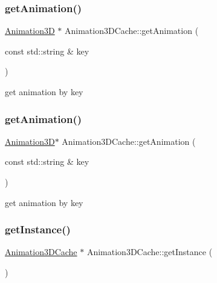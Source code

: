 \subsubsection{\texorpdfstring{get\+Animation()}{getAnimation()}\hspace{0.1cm}{\footnotesize\ttfamily [1/2]}}
{\footnotesize\ttfamily \hyperlink{classAnimation3D}{Animation3D} $\ast$ Animation3\+D\+Cache\+::get\+Animation (\begin{DoxyParamCaption}\item[{const std\+::string \&}]{key }\end{DoxyParamCaption})}

get animation by key \mbox{\label{classAnimation3DCache_ab5cc758098c8b406fd9564aac0ac4753}} 
\subsubsection{\texorpdfstring{get\+Animation()}{getAnimation()}\hspace{0.1cm}{\footnotesize\ttfamily [2/2]}}
{\footnotesize\ttfamily \hyperlink{classAnimation3D}{Animation3D}$\ast$ Animation3\+D\+Cache\+::get\+Animation (\begin{DoxyParamCaption}\item[{const std\+::string \&}]{key }\end{DoxyParamCaption})}

get animation by key \mbox{\label{classAnimation3DCache_a50a742469d01ac53e566a5a7cf7e1a66}} 
\subsubsection{\texorpdfstring{get\+Instance()}{getInstance()}\hspace{0.1cm}{\footnotesize\ttfamily [1/2]}}
{\footnotesize\ttfamily \hyperlink{classAnimation3DCache}{Animation3\+D\+Cache} $\ast$ Animation3\+D\+Cache\+::get\+Instance (\begin{DoxyParamCaption}{ }\end{DoxyParamCaption})\hspace{0.3cm}{\ttfamily [static]}}

